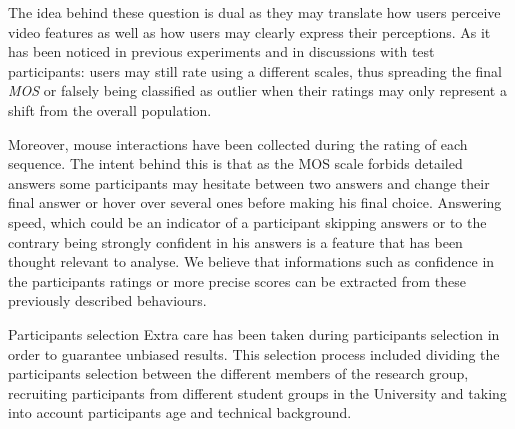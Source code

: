 \begin{frame}
The idea behind these question is dual as they may translate how users perceive video features as well as how users may clearly express their perceptions. As it has been noticed in previous experiments and in discussions with test participants: users may still rate using a different scales, thus spreading the final \textit{MOS} or falsely being classified as outlier when their ratings may only represent a shift from the overall population. 

Moreover, mouse interactions have been collected during the rating of each sequence. The intent behind this is that as the MOS scale forbids detailed answers some participants may hesitate between two answers and change their final answer or hover over several ones before making his final choice.
Answering speed, which could be an indicator of a participant skipping answers or to the contrary being strongly confident in his answers is a feature that has been thought relevant to analyse. 
We believe that informations such as confidence in the participants ratings or more precise scores can be extracted from these previously described behaviours.


\large{Participants selection}
Extra care has been taken during participants selection in order to guarantee unbiased results. This selection process included dividing the participants selection between the different members of the research  group, recruiting participants from different student groups in the University and taking into account participants age and technical background.
\end{frame}